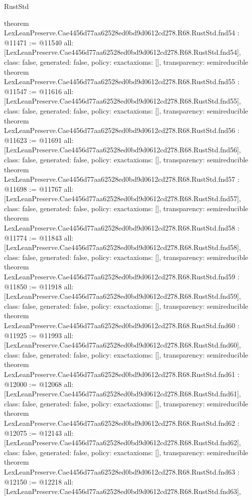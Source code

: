 \begin{lexlean}{RustStd}
\begin{coremodule}
{}
theorem LexLeanPreserve.Cae4456d77aa62528ed0bd9d0612cd278.R68.RustStd.fnd54 : @11471 := @11540 {
  all: [LexLeanPreserve.Cae4456d77aa62528ed0bd9d0612cd278.R68.RustStd.fnd54],
  class: false,
  generated: false,
  policy: exact{axioms: []},
  transparency: semireducible
}
theorem LexLeanPreserve.Cae4456d77aa62528ed0bd9d0612cd278.R68.RustStd.fnd55 : @11547 := @11616 {
  all: [LexLeanPreserve.Cae4456d77aa62528ed0bd9d0612cd278.R68.RustStd.fnd55],
  class: false,
  generated: false,
  policy: exact{axioms: []},
  transparency: semireducible
}
theorem LexLeanPreserve.Cae4456d77aa62528ed0bd9d0612cd278.R68.RustStd.fnd56 : @11623 := @11691 {
  all: [LexLeanPreserve.Cae4456d77aa62528ed0bd9d0612cd278.R68.RustStd.fnd56],
  class: false,
  generated: false,
  policy: exact{axioms: []},
  transparency: semireducible
}
theorem LexLeanPreserve.Cae4456d77aa62528ed0bd9d0612cd278.R68.RustStd.fnd57 : @11698 := @11767 {
  all: [LexLeanPreserve.Cae4456d77aa62528ed0bd9d0612cd278.R68.RustStd.fnd57],
  class: false,
  generated: false,
  policy: exact{axioms: []},
  transparency: semireducible
}
theorem LexLeanPreserve.Cae4456d77aa62528ed0bd9d0612cd278.R68.RustStd.fnd58 : @11774 := @11843 {
  all: [LexLeanPreserve.Cae4456d77aa62528ed0bd9d0612cd278.R68.RustStd.fnd58],
  class: false,
  generated: false,
  policy: exact{axioms: []},
  transparency: semireducible
}
theorem LexLeanPreserve.Cae4456d77aa62528ed0bd9d0612cd278.R68.RustStd.fnd59 : @11850 := @11918 {
  all: [LexLeanPreserve.Cae4456d77aa62528ed0bd9d0612cd278.R68.RustStd.fnd59],
  class: false,
  generated: false,
  policy: exact{axioms: []},
  transparency: semireducible
}
theorem LexLeanPreserve.Cae4456d77aa62528ed0bd9d0612cd278.R68.RustStd.fnd60 : @11925 := @11993 {
  all: [LexLeanPreserve.Cae4456d77aa62528ed0bd9d0612cd278.R68.RustStd.fnd60],
  class: false,
  generated: false,
  policy: exact{axioms: []},
  transparency: semireducible
}
theorem LexLeanPreserve.Cae4456d77aa62528ed0bd9d0612cd278.R68.RustStd.fnd61 : @12000 := @12068 {
  all: [LexLeanPreserve.Cae4456d77aa62528ed0bd9d0612cd278.R68.RustStd.fnd61],
  class: false,
  generated: false,
  policy: exact{axioms: []},
  transparency: semireducible
}
theorem LexLeanPreserve.Cae4456d77aa62528ed0bd9d0612cd278.R68.RustStd.fnd62 : @12075 := @12143 {
  all: [LexLeanPreserve.Cae4456d77aa62528ed0bd9d0612cd278.R68.RustStd.fnd62],
  class: false,
  generated: false,
  policy: exact{axioms: []},
  transparency: semireducible
}
theorem LexLeanPreserve.Cae4456d77aa62528ed0bd9d0612cd278.R68.RustStd.fnd63 : @12150 := @12218 {
  all: [LexLeanPreserve.Cae4456d77aa62528ed0bd9d0612cd278.R68.RustStd.fnd63],
}
\end{coremodule}
\end{lexlean}
